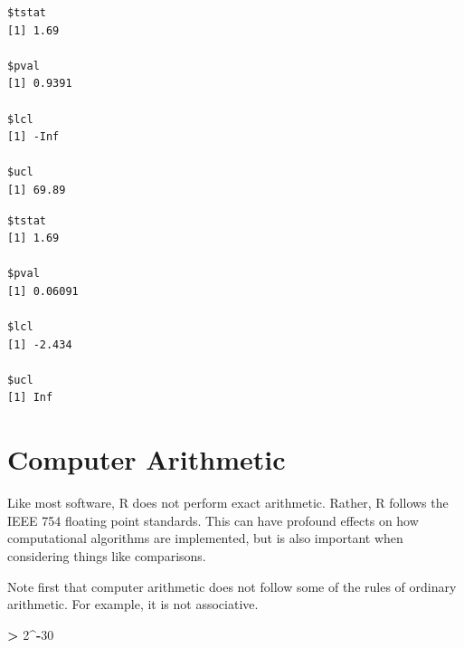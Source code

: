 \documentclass[]{krantz}
\makeatletter
\newenvironment{Shaded}{\begin{snugshade}}{\end{snugshade}}
\newcommand{\DataTypeTok}[1]{\textcolor[rgb]{0.27,0.27,0.27}{#1}}
\newcommand{\DecValTok}[1]{\textcolor[rgb]{0.06,0.06,0.06}{#1}}
\newcommand{\KeywordTok}[1]{\textcolor[rgb]{0.27,0.27,0.27}{\textbf{#1}}}
\newcommand{\NormalTok}[1]{#1}
\newcommand{\OperatorTok}[1]{\textcolor[rgb]{0.43,0.43,0.43}{\textbf{#1}}}
\newcommand{\StringTok}[1]{\textcolor[rgb]{0.5,0.5,0.5}{#1}}
\newenvironment{kframe}{%
\medskip{}
\setlength{\fboxsep}{.8em}
 \def\at@end@of@kframe{}%
 \ifinner\ifhmode%
  \def\at@end@of@kframe{\end{minipage}}%
  \begin{minipage}{\columnwidth}%
 \fi\fi%
 \def\FrameCommand##1{\hskip\@totalleftmargin \hskip-\fboxsep
 \colorbox{shadecolor}{##1}\hskip-\fboxsep
     \hskip-\linewidth \hskip-\@totalleftmargin \hskip\columnwidth}%
 \MakeFramed {\advance\hsize-\width
   \@totalleftmargin\z@ \linewidth\hsize
   \@setminipage}}%
 {\par\unskip\endMakeFramed%
 \at@end@of@kframe}
\renewenvironment{Shaded}{\begin{kframe}}{\end{kframe}}
\makeatother
\begin{document}
\begin{Shaded}
\end{Shaded}

\begin{verbatim}
$tstat
[1] 1.69

$pval
[1] 0.9391

$lcl
[1] -Inf

$ucl
[1] 69.89
\end{verbatim}

\begin{Shaded}
\end{Shaded}

\begin{verbatim}
$tstat
[1] 1.69

$pval
[1] 0.06091

$lcl
[1] -2.434

$ucl
[1] Inf
\end{verbatim}

\hypertarget{arith}{%
\section{Computer Arithmetic}\label{arith}}

Like most software, R does not perform exact arithmetic. Rather, R follows the IEEE 754 floating point standards. This can have profound effects on how computational algorithms are implemented, but is also important when considering things like comparisons.

Note first that computer arithmetic does not follow some of the rules of ordinary arithmetic. For example, it is not associative.

\begin{Shaded}
\begin{Highlighting}[]
\OperatorTok{>}\StringTok{ }\DecValTok{2}\OperatorTok{^-}\DecValTok{30}
\end{Highlighting}
\end{Shaded}
\end{document}
